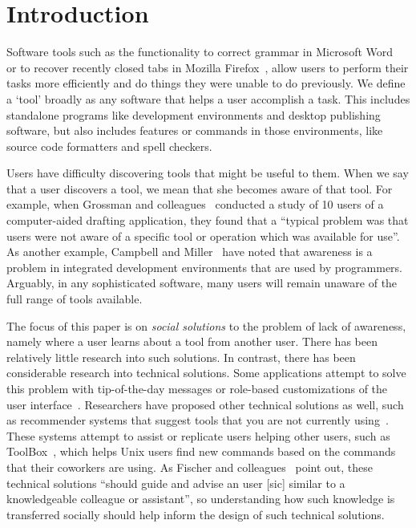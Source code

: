 \documentclass[smallextended]{svjour3}
\begin{document}
\section{Introduction}\label{sec:intro}

\noindent
Software tools such as the functionality to correct grammar in Microsoft
Word~\citeyearpar{word} or to recover recently closed tabs in Mozilla Firefox~\citeyearpar{firefox}, allow users to 
perform their tasks more efficiently and do things they were unable to do
previously.
We define a `tool' broadly as any software that helps a user accomplish a task.
This includes standalone programs like development environments 
and desktop publishing software,
but also includes features or commands in those environments, 
like source code formatters and spell checkers.

Users have difficulty discovering tools that might be
useful to them.
When we say that a user discovers a tool, we mean that she becomes
aware of that tool.
For example, when Grossman and colleagues~\citeyearpar{grossman09} conducted a study of 10 users of
a computer-aided drafting application, they found that a ``typical problem was
that users were not aware of a specific tool or operation which was available for
use''.
As another example, Campbell and Miller~\citeyearpar{campbell08} have noted that awareness is a problem
in integrated development environments that are used by
programmers. 
Arguably, in any sophisticated software, many
users will remain unaware of the full range of tools available.

The focus of this paper is on \emph{social solutions} to the problem of lack of
awareness, namely where a user learns about a tool from another user. 
There has been relatively little research into such solutions. 
In contrast, there has been
considerable research into technical solutions.
Some applications attempt to solve this problem with tip-of-the-day messages or
role-based customizations of the user interface~\citep{findlater08}.
Researchers have proposed other technical solutions as well,
such as recommender systems that suggest tools that you are not currently 
using~\citep{linton,maltzahn,matejka09}.
These systems attempt to assist or replicate users helping other users, 
such as ToolBox~\citep{maltzahn}, which helps Unix users find new commands based on the
commands that their coworkers are using.
As Fischer and colleagues~\citeyearpar[p.~115]{fischer84} point out, these technical solutions ``should guide
and advise an user [sic] similar to a knowledgeable colleague or
assistant'', so understanding how such knowledge is
transferred socially should help inform the design of such technical solutions.
\end{document}

